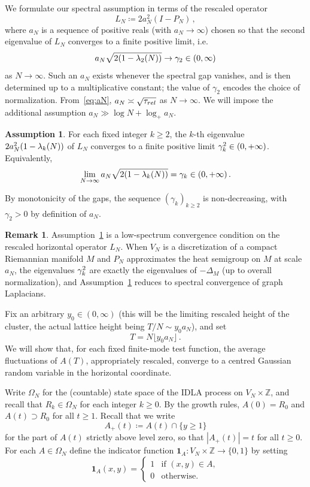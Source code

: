 \documentclass[11pt,a4paper,reqno]{amsart}
\theoremstyle{definition}
\newtheorem{Remark}[Theorem]{Remark}
\newtheorem{Assumption}[Theorem]{Assumption}
\newcommand{\bbZ}{{\ensuremath{\mathbb Z}} }
\begin{document}
We formulate our spectral assumption in terms of the rescaled operator
	\begin{equation}\label{def:LN}
	 L_N \coloneqq 2a_N^2 (I - P_N)\,,
	\end{equation}
where $a_N$ is a sequence of positive reals (with $a_N \to \infty$) chosen so that the second eigenvalue of $L_N$ converges to a finite positive limit, i.e.\
	\begin{equation}\label{eq:aN}
	a_N \sqrt{2(1-\lambda_2(N))} \to \gamma_2 \in (0, \infty)
	\end{equation}
as $N\to\infty$. Such an $a_N$ exists whenever the spectral gap vanishes, and is then determined up to a multiplicative constant; the value of $\gamma_2$ encodes the choice of normalization. From~\eqref{eq:aN}, $a_N \asymp \sqrt{\tau_{rel}}$ as $N\to\infty$. We will impose the additional assumption $a_N \gg \log N + \log_+ a_N$.

\begin{Assumption}\label{a:spectral}
For each fixed integer $k \geq 2$, the $k$-th eigenvalue $2a_N^2(1 - \lambda_k(N))$ of $L_N$ converges to a finite positive limit $\gamma_k^2 \in (0, +\infty)$. Equivalently,
	\[ \lim_{N\to\infty} a_N \sqrt{2(1-\lambda_k(N))} = \gamma_k \in (0, +\infty)\,. \]
\end{Assumption}
By monotonicity of the gaps, the sequence $(\gamma_k )_{k\geq 2}$ is non-decreasing, with $\gamma_2 >0$ by definition of $a_N$.

\begin{Remark}
Assumption~\ref{a:spectral} is a low-spectrum convergence condition on the rescaled horizontal operator $L_N$. When $V_N$ is a discretization of a compact Riemannian manifold $M$ and $P_N$ approximates the heat semigroup on $M$ at scale $a_N$, the eigenvalues $\gamma_k^2$ are exactly the eigenvalues of $-\Delta_M$ (up to overall normalization), and Assumption~\ref{a:spectral} reduces to spectral convergence of graph Laplacians.
\end{Remark}


Fix an arbitrary $y_0 \in (0,\infty )$ (this will be the limiting rescaled height of the cluster, the actual lattice height being $T/N \sim y_0 a_N$), and set
	\[ T = N \lfloor y_0 a_N \rfloor\,. \]
We will show that, for each fixed finite-mode test function, the average fluctuations of $A(T)$, appropriately rescaled, converge to a centred Gaussian random variable in the horizontal coordinate.

Write $\Omega_N$ for the (countable) state space of the IDLA process on $V_N \times \bbZ$, and recall that $R_k \in \Omega_N$ for each integer $k \geq 0$. By the growth rules, $A(0) = R_0$ and $A(t) \supset R_0$ for all $t \geq 1$. Recall that we write
	\[ A_+(t) \coloneqq A(t) \cap \{ y\geq 1\} \]
for the part of $A(t)$ strictly above level zero, so that $| A_+ (t) | = t$ for all $t\geq 0$. 
For each $A \in \Omega_N$ define the indicator function
$\mathbf{1}_A : V_N \times \bbZ \to \{ 0,1\} $ by setting 
	\[ \mathbf{1}_A(x,y) = \begin{cases}
	1 & \mbox{if } (x,y) \in A, \\
	0 & \mbox{otherwise.}
	\end{cases} \]
\end{document}
